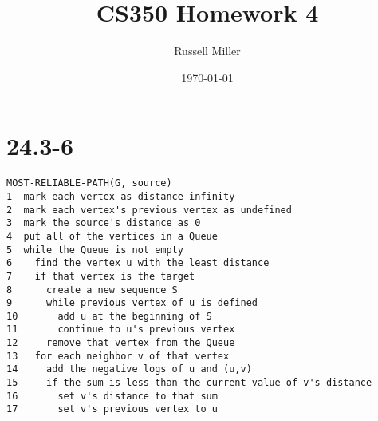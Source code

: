 \documentclass{article}
\title{CS350 Homework 4}
\author{Russell Miller}
\date{\today}
\begin{document}
\maketitle

\section*{24.3-6}
\begin{verbatim}
MOST-RELIABLE-PATH(G, source)
1  mark each vertex as distance infinity
2  mark each vertex's previous vertex as undefined
3  mark the source's distance as 0
4  put all of the vertices in a Queue
5  while the Queue is not empty
6    find the vertex u with the least distance
7    if that vertex is the target
8      create a new sequence S
9      while previous vertex of u is defined
10       add u at the beginning of S
11       continue to u's previous vertex
12     remove that vertex from the Queue
13   for each neighbor v of that vertex
14     add the negative logs of u and (u,v)
15     if the sum is less than the current value of v's distance
16       set v's distance to that sum
17       set v's previous vertex to u
\end{verbatim}
\end{document}
